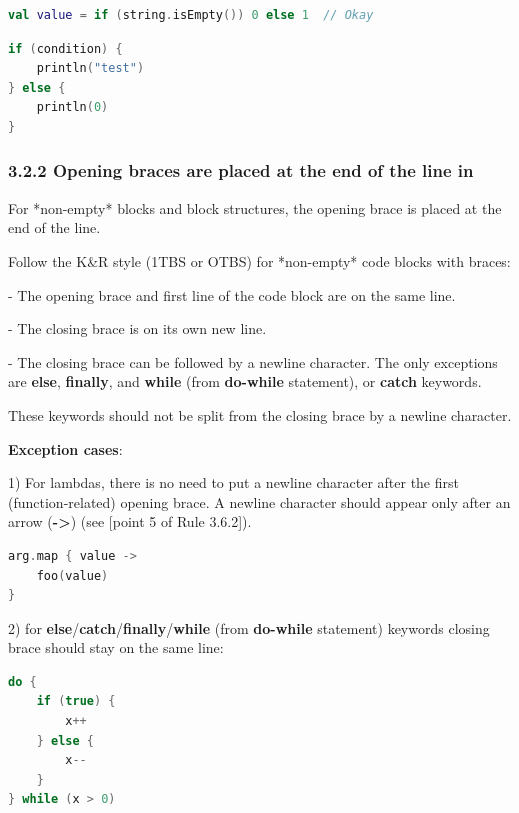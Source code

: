 \begin{lstlisting}[language=Kotlin]
val value = if (string.isEmpty()) 0 else 1  // Okay
\end{lstlisting}


\begin{lstlisting}[language=Kotlin]
if (condition) {
    println("test")
} else {
    println(0)
}
\end{lstlisting}


\subsubsection*{\textbf{3.2.2  Opening braces are placed at the end of the line in}}
\leavevmode\newline

\label{sec:3.2.2}

For *non-empty* blocks and block structures, the opening brace is placed at the end of the line.

Follow the K\&R style (1TBS or OTBS) for *non-empty* code blocks with braces:

- The opening brace and first line of the code block are on the same line.

- The closing brace is on its own new line.

- The closing brace can be followed by a newline character. The only exceptions are \textbf{else}, \textbf{finally}, and \textbf{while} (from \textbf{do-while} statement), or \textbf{catch} keywords.

These keywords should not be split from the closing brace by a newline character.



\textbf{Exception cases}: 



1) For lambdas, there is no need to put a newline character after the first (function-related) opening brace. A newline character should appear only after an arrow (\textbf{->}) (see [point 5 of Rule 3.6.2]).



\begin{lstlisting}[language=Kotlin]
arg.map { value ->
    foo(value)
}
\end{lstlisting}


2) for \textbf{else}/\textbf{catch}/\textbf{finally}/\textbf{while} (from \textbf{do-while} statement) keywords closing brace should stay on the same line:

\begin{lstlisting}[language=Kotlin]
do {
    if (true) {
        x++
    } else {
        x--
    }
} while (x > 0) 
\end{lstlisting}
 

